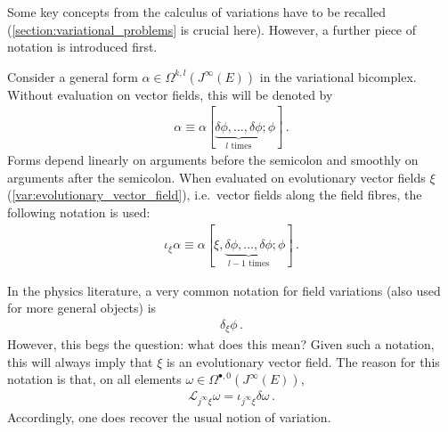     Some key concepts from the calculus of variations have to be recalled (\cref{section:variational_problems} is crucial here). However, a further piece of notation is introduced first.
    \begin{notation}
        Consider a general form $\alpha\in\Omega^{k,l}(J^\infty(E))$ in the variational bicomplex. Without evaluation on vector fields, this will be denoted by
        \begin{gather*}
            \alpha \equiv \alpha[\underbrace{\delta\phi,\ldots,\delta\phi}_{l\text{ times}};\phi]\,.
        \end{gather*}
        Forms depend linearly on arguments before the semicolon and smoothly on arguments after the semicolon. When evaluated on evolutionary vector fields $\xi$ (\cref{var:evolutionary_vector_field}), i.e.~vector fields along the field fibres, the following notation is used:
        \begin{gather*}
            \iota_\xi\alpha \equiv \alpha[\xi,\underbrace{\delta\phi,\ldots,\delta\phi}_{l-1\text{ times}};\phi]\,.
        \end{gather*}
    \end{notation}

    \begin{notation}
        In the physics literature, a very common notation for field variations (also used for more general objects) is
        \begin{gather*}
            \delta_\xi\phi\,.
        \end{gather*}
        However, this begs the question: what does this mean? Given such a notation, this will always imply that $\xi$ is an evolutionary vector field. The reason for this notation is that, on all elements $\omega\in\Omega^{\bullet,0}(J^\infty(E))$,
        \begin{gather}
            \mathcal{L}_{j^\infty\xi}\omega = \iota_{j^\infty\xi}\delta\omega\,.
        \end{gather}
        Accordingly, one does recover the usual notion of variation.
    \end{notation}

